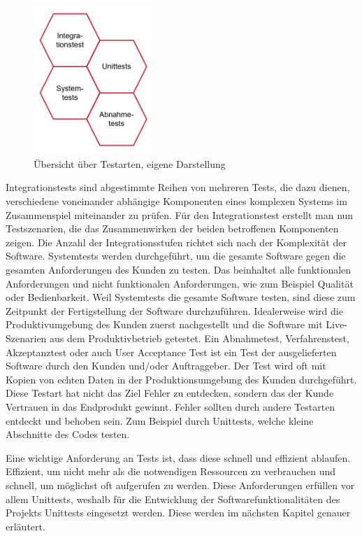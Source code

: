 \documentclass[a4paper,titlepage,halfparskip,12pt]{scrreprt}
\begin{document}
\begin{onehalfspacing}
\begin{figure}[h]
	\centering
	\includegraphics[width=4.5cm]{images/Testarten.png}
	\caption{Übersicht über Testarten, eigene Darstellung}
	\label{img:Testarten}
\end{figure}

Integrationstests sind abgestimmte Reihen von mehreren Tests, die dazu dienen, verschiedene voneinander abhängige Komponenten eines komplexen Systems im Zusammenspiel miteinander zu prüfen. Für den Integrationstest erstellt man nun Testszenarien, die das Zusammenwirken der beiden betroffenen Komponenten zeigen. Die Anzahl der Integrationsstufen richtet sich nach der Komplexität der Software. Systemtests werden durchgeführt, um die gesamte Software gegen die gesamten Anforderungen des Kunden zu testen. Das beinhaltet alle funktionalen Anforderungen und nicht funktionalen Anforderungen, wie zum Beispiel Qualität oder Bedienbarkeit. Weil Systemtests die gesamte Software testen, sind diese zum Zeitpunkt der Fertigstellung der Software durchzuführen. Idealerweise wird die Produktivumgebung des Kunden zuerst nachgestellt und die Software mit Live-Szenarien aus dem Produktivbetrieb getestet. Ein Abnahmetest, Verfahrenstest, Akzeptanztest oder auch User Acceptance Test ist ein Test der ausgelieferten Software durch den Kunden und/oder Auftraggeber. Der Test wird oft mit Kopien von echten Daten in der Produktionsumgebung des Kunden durchgeführt. Diese Testart hat nicht das Ziel Fehler zu entdecken, sondern das der Kunde Vertrauen in das Endprodukt gewinnt. Fehler sollten durch andere Testarten entdeckt und behoben sein. Zum Beispiel durch Unittests, welche kleine Abschnitte des Codes testen.\cite{witte2019testmanagement}

\smallskip

Eine wichtige Anforderung an Tests ist, dass diese schnell und effizient ablaufen. Effizient, um nicht mehr als die notwendigen Ressourcen zu verbrauchen und schnell, um möglichst oft aufgerufen zu werden.\cite{hubertz2016softwaretests} Diese Anforderungen erfüllen vor allem Unittests, weshalb für die Entwicklung der Softwarefunktionalitäten des Projekts Unittests eingesetzt werden. Diese werden im nächsten Kapitel genauer erläutert.


\end{onehalfspacing}
\end{document}
